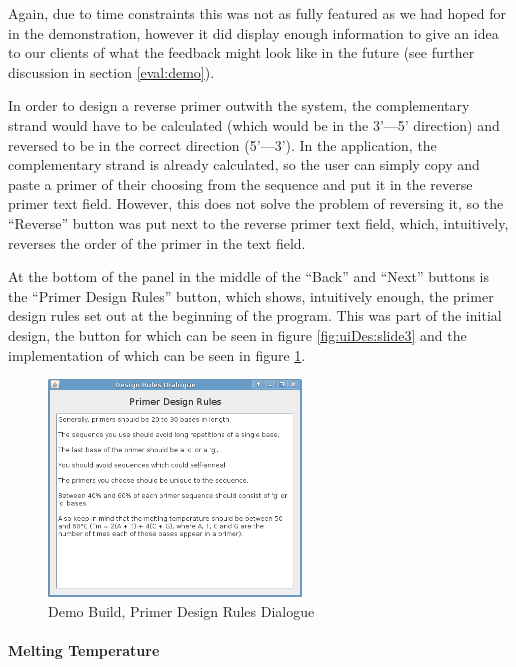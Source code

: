 Again, due to time constraints this was not as fully featured as we
had hoped for in the demonstration, however it did display enough
information to give an idea to our clients of what the feedback might
look like in the future (see further discussion in section
\ref{eval:demo}).

In order to design a reverse primer outwith the system, the
complementary strand would have to be calculated (which would be in
the 3'---5' direction) and reversed to be in the correct direction
(5'---3').
In the application, the complementary strand is already calculated, so
the user can simply copy and paste a primer of their choosing from the
sequence and put it in the reverse primer text field.
However, this does not solve the problem of reversing it, so the
``Reverse'' button was put next to the reverse primer text field,
which, intuitively, reverses the order of the primer in the text
field. 

At the bottom of the panel in the middle of the ``Back'' and ``Next''
buttons is the ``Primer Design Rules'' button, which shows,
intuitively enough, the primer design rules set out at the beginning
of the program.
This was part of the initial design, the button for which can be seen
in figure \ref{fig:uiDes:slide3} and the implementation of which can
be seen in figure \ref{fig:demoBuild:primerDesignRules}.

\begin{figure}[h]
  \begin{center}
    \includegraphics[width=0.6\textwidth]{./images/demoBuild/primerDesignRules.png}
    \caption{
      \label{fig:demoBuild:primerDesignRules}
      Demo Build, Primer Design Rules Dialogue
    }
  \end{center}
\end{figure}

\paragraph{Melting Temperature}


